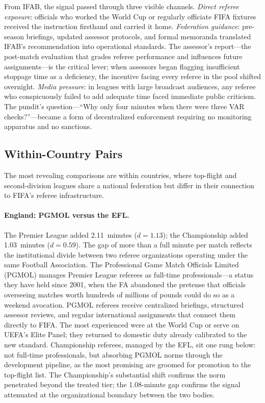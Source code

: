 From IFAB, the signal passed through three visible channels.
\textit{Direct referee exposure}: officials who worked the World Cup
or regularly officiate FIFA fixtures received the instruction firsthand
and carried it home. \textit{Federation guidance}: pre-season
briefings, updated assessor protocols, and formal memoranda translated
IFAB's recommendation into operational standards. The assessor's
report---the post-match evaluation that grades referee performance and
influences future assignments---is the critical lever; when assessors
began flagging insufficient stoppage time as a deficiency, the
incentive facing every referee in the pool shifted overnight.
\textit{Media pressure}: in leagues with large broadcast audiences,
any referee who conspicuously failed to add adequate time faced
immediate public criticism. The pundit's question---``Why only four
minutes when there were three VAR checks?''---became a form of
decentralized enforcement requiring no monitoring apparatus and no
sanctions.


\subsection{Within-Country Pairs}
\label{sec:first_stage:pairs}

The most revealing comparisons are within countries, where top-flight
and second-division leagues share a national federation but differ in
their connection to FIFA's referee infrastructure.

\paragraph{England: PGMOL versus the EFL.}
The Premier League added 2.11~minutes ($d = 1.13$); the Championship
added 1.03~minutes ($d = 0.59$). The gap of more than a full minute
per match reflects the institutional divide between two referee
organizations operating under the same Football Association. The
Professional Game Match Officials Limited (PGMOL) manages Premier League
referees as full-time professionals---a status they have held since 2001,
when the FA abandoned the pretense that officials overseeing matches
worth hundreds of millions of pounds could do so as a weekend avocation.
PGMOL referees receive centralized briefings, structured assessor
reviews, and regular international assignments that connect them directly
to FIFA. The most experienced were at the World Cup or serve on UEFA's
Elite Panel; they returned to domestic duty already calibrated to the new
standard. Championship referees, managed by the EFL, sit one rung below:
not full-time professionals, but absorbing PGMOL norms through the
development pipeline, as the most promising are groomed for promotion to
the top-flight list. The Championship's substantial shift confirms the
norm penetrated beyond the treated tier; the 1.08-minute gap confirms
the signal attenuated at the organizational boundary between the two
bodies.

